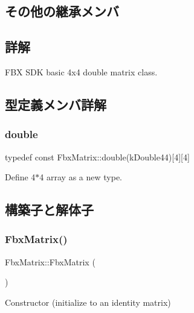 \subsection*{その他の継承メンバ}


\subsection{詳解}
F\+BX S\+DK basic 4x4 double matrix class. 

\subsection{型定義メンバ詳解}
\mbox{\label{class_fbx_matrix_a01f8be57393e5d9973b23897c29d5520}} 
\subsubsection{\texorpdfstring{double}{double}}
{\footnotesize\ttfamily typedef const Fbx\+Matrix\+::double(k\+Double44)\mbox{[}4\mbox{]}\mbox{[}4\mbox{]}}



Define 4$\ast$4 array as a new type. 



\subsection{構築子と解体子}
\mbox{\label{class_fbx_matrix_a06dc051202b75dec9827f9bddaae2007}} 
\subsubsection{\texorpdfstring{Fbx\+Matrix()}{FbxMatrix()}\hspace{0.1cm}{\footnotesize\ttfamily [1/6]}}
{\footnotesize\ttfamily Fbx\+Matrix\+::\+Fbx\+Matrix (\begin{DoxyParamCaption}{ }\end{DoxyParamCaption})}



Constructor (initialize to an identity matrix) 

\mbox{\label{class_fbx_matrix_a4f9893c514abe0902a9558f3c28994db}} 
